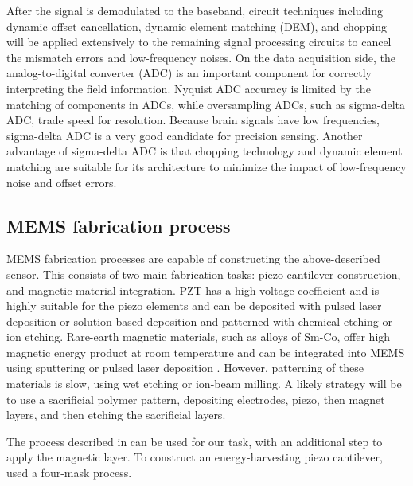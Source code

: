 After the signal is demodulated to the baseband, circuit techniques including dynamic offset cancellation, dynamic element matching (DEM), and chopping will be applied extensively to the remaining signal processing circuits to cancel the mismatch errors and low-frequency noises. On the data acquisition side, the analog-to-digital converter (ADC) is an important component for correctly interpreting the field information. Nyquist ADC accuracy is limited by the matching of components in ADCs, while oversampling ADCs, such as sigma-delta ADC, trade speed for resolution. Because brain signals have low frequencies, sigma-delta ADC is a very good candidate for precision sensing. Another advantage of sigma-delta ADC is that chopping technology and dynamic element matching are suitable for its architecture to minimize the impact of low-frequency noise and offset errors.


\subsection{MEMS fabrication process}

MEMS fabrication processes are capable of constructing the above-described sensor. This consists of two main fabrication tasks: piezo cantilever construction, and magnetic material integration. PZT has a high voltage coefficient and is highly suitable for the piezo elements \cite{tadigadapa2009piezoelectric} and can be deposited with pulsed laser deposition or solution-based deposition and patterned with chemical etching or ion etching. Rare-earth magnetic materials, such as alloys of Sm-Co, offer high magnetic energy product at room temperature and can be integrated into MEMS using sputtering or pulsed laser deposition \cite{arnold2009permanent}. However, patterning of these materials is slow, using wet etching or ion-beam milling. A likely strategy will be to use a sacrificial polymer pattern, depositing electrodes, piezo, then magnet layers, and then etching the sacrificial layers. 

The process described in \cite{shen2008design} can be used for our task, with an additional step to apply the magnetic layer. To construct an energy-harvesting piezo cantilever, \cite{shen2008design} used a four-mask process.



